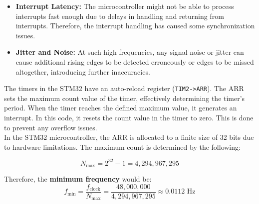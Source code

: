 \documentclass[12pt]{article}
\begin{document}
\begin{itemize}[leftmargin=2em]
    \item  \textbf{Interrupt Latency:} The microcontroller might not be able to process interrupts fast enough due to delays in handling and returning from interrupts. Therefore, the interrupt handling has caused some synchronization issues.
    \item \textbf{Jitter and Noise:} At such high frequencies, any signal noise or jitter can cause additional rising edges to be detected erroneously or edges to be missed altogether, introducing further inaccuracies.
\end{itemize}

The timers in the STM32 have an auto-reload register (\texttt{TIM2->ARR}). The ARR sets the maximum count value of the timer, effectively determining the timer's period. When the timer reaches the defined maximum value, it generates an interrupt. In this code, it resets the count value in the timer to zero. This is done to prevent any overflow issues.
\\[6pt]
In the STM32 microcontroller, the ARR is allocated to a finite size of 32 bits due to hardware limitations. The maximum count is determined by the following:

$$N_{\text{max}} = 2^{32} - 1 = 4,294,967,295$$

Therefore, the \textbf{minimum frequency} would be:
$$f_{\text{min}} = \frac{f_{\text{clock}}}{N_{\text{max}}} = \frac{48,000,000}{4,294,967,295} \approx 0.0112 \text{ Hz}$$
\end{document}
